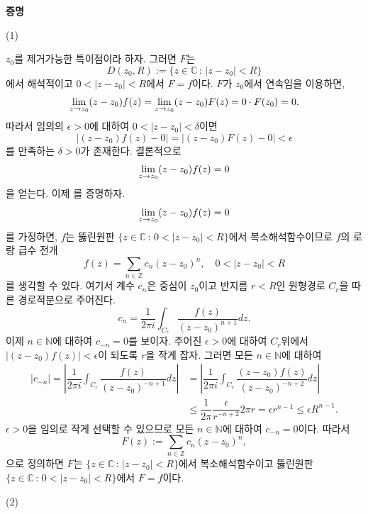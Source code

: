 {\bf 증명}

(1) 

$z_0$를 제거가능한 특이점이라 하자. 그러면 $F$는
\[
D(z_0,R):= \{ z\in\mathbb C\,:\, |z-z_0|<R\}
\]
에서 해석적이고 $0<|z-z_0| <R$에서 $F=f$이다.
$F$가 $z_0$에서 연속임을 이용하면,
\[
\lim\limits_{z\to z_0} (z-z_0)f(z) = \lim\limits_{z\to z_0} (z-z_0)F(z) = 0\cdot F(z_0) = 0.
\]
따라서 임의의 $\epsilon>0$에 대하여
$0<|z-z_0|<\delta$이면
\[
|(z-z_0)f(z) -0| = |(z-z_0)F(z) -0| < \epsilon
\]
를 만족하는 $\delta>0$가 존재한다.
결론적으로 
\[
\lim\limits_{z\to z_0} (z-z_0)f(z) = 0
\]
을 얻는다.
이제 
를
증명하자.
\[
\lim\limits_{z\to z_0} (z-z_0)f(z) = 0
\]
를 가정하면, $f$는 뚫린원판 $\{z\in\mathbb C\,:\, 0<|z-z_0|<R\}$에서
복소해석함수이므로
$f$의 로랑 급수 전개
\[
f(z) = \sum_{n\in\mathbb Z} c_n(z-z_0)^n, \quad
0 < |z-z_0| <R
\]
를 생각할 수 있다. 여기서 계수 $c_n$은 
중심이 $z_0$이고 반지름 $r<R$인 원형경로 
$C_r$을 따른 경로적분으로 주어진다.
\[
c_n = \dfrac1{2\pi i} \int_{C_r} \dfrac{f(z)}{(z-z_0)^{n+1}}dz.
\]
이제 $n\in\mathbb N$에 대하여 $c_{-n}=0$를 보이자.
주어진 $\epsilon>0$에 대하여 
$C_r$위에서 $|(z-z_0)f(z)| <\epsilon$이 되도록 $r$을 작게 잡자.
그러면 모든 $n\in\mathbb N$에 대하여
\begin{align*}
|c_{-n}| = \left| \dfrac1{2\pi i} \int_{C_r} \dfrac{f(z)}{(z-z_0)^{-n+1}}dz \right|
&= \left| \dfrac1{2\pi i} \int_{C_r} \dfrac{(z-z_0)f(z)}{(z-z_0)^{-n+2}}dz \right| \\
&\le \dfrac1{2\pi} \dfrac\epsilon{r^{-n+2}} 2\pi r = \epsilon r^{n-1}
\le \epsilon R^{n-1}.
\end{align*}
$\epsilon>0$을 임의로 작게 선택할 수 있으므로 
모든 $n\in\mathbb N$에 대하여 $c_{-n}=0$이다.
따라서
\[
F(z):= \sum_{n\in\mathbb Z} c_n(z-z_0)^n,
\]
으로 정의하면 $F$는 $\{z\in\mathbb C\,:\, |z-z_0|<R\}$에서
복소해석함수이고
뚫린원판 $\{z\in\mathbb C\,:\, 0<|z-z_0|<R\}$에서 $F=f$이다.

(2) 

